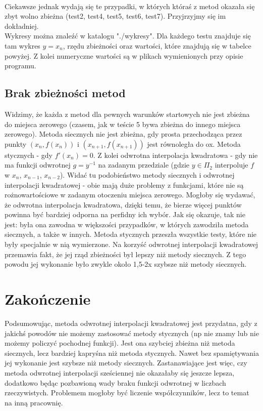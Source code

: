 \documentclass[11pt,wide]{mwart}
\begin{document}
\\ \indent Ciekawsze jednak wydają się te przypadki, w których któraś z metod okazała się zbyt wolno zbieżna (test2, test4, test5, test6, test7). Przyjrzyjmy się im dokładniej.
{\small{\\Wykresy można znaleźć w katalogu "./wykresy". Dla każdego testu znajduje się tam wykres $y = x_{n}$, rzędu zbieżności oraz wartości, które znajdują się w tabelce powyżej. Z kolei numeryczne wartości są w plikach wymienionych przy opisie programu. }} 
\subsection{Brak zbieżności metod}
Widzimy, że każda z metod dla pewnych warunków startowych nie jest zbieżna do miejsca zerowego (czasem, jak w teście 5 bywa zbieżna do innego miejsca zerowego). Metoda siecznych nie jest zbieżna, gdy prosta przechodząca przez punkty $(x_{n}, f(x_{n}))$ i $(x_{n+1}, f(x_{n+1}))$ jest równoległa do ox. Metoda stycznych - gdy $f'(x_{n}) = 0$. Z kolei odwrotna interpolacja kwadratowa - gdy nie ma funkcji odwrotnej $g = y^{-1}$ na zadanym przedziale (gdzie $y \in \Pi_2$ interpoluje $f$ w $x_{n}$, $x_{n-1}$, $x_{n-2}$).
Widać tu podobieństwo metody siecznych i odwrotnej interpolacji kwadratowej - obie mają duże problemy z funkcjami, które nie są rożnowartościowe w zadanym otoczeniu miejsca zerowego. Mogłoby się wydawać, że odwrotna interpolacja kwadratowa, dzięki temu, że bierze więcej punktów powinna być bardziej odporna na perfidny ich wybór. Jak się okazuje, tak nie jest: była ona zawodna w większości przypadków, w których zawodziła metoda siecznych, a także w innych. Metoda stycznych przeszła wszystkie testy, które nie były specjalnie w nią wymierzone. Na korzyść odwrotnej interpolacji kwadratowej przemawia fakt, że jej rząd zbieżności był lepszy niż metody siecznych. Z tego powodu jej wykonanie było zwykle około 1,5-2x szybsze niż metody siecznych.
\section{Zakończenie}
Podsumowując, metoda odwrotnej interpolacji kwadratowej jest przydatna, gdy z jakichś powodów nie możemy zastosować metody stycznych (np nie znamy lub nie możemy policzyć pochodnej funkcji). Jest ona szybciej zbieżna niż metoda siecznych, lecz bardziej kapryśna niż metoda stycznych. Nawet bez spamiętywania jej wykonanie jest szybsze niż metody siecznych. Zastanawiające jest więc, czy metoda odwrotnej interpolacji sześciennej nie okazałaby się jeszcze lepsza, dodatkowo będąc pozbawioną wady braku funkcji odwrotnej w liczbach rzeczywistych. Problemem mogłoby być liczenie współczynników, lecz to temat na inną pracownię.
\end{document}
